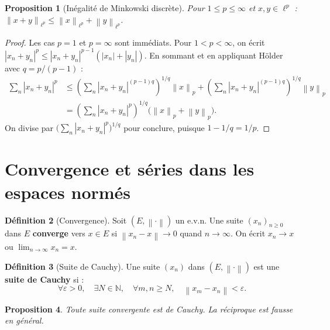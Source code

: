 \documentclass[a4paper,12pt]{book}
\newcommand{\N}{\mathbb{N}}
\newcommand{\norm}[1]{\left\| #1 \right\|}
\newcommand{\abs}[1]{\left| #1 \right|}
\theoremstyle{definition}
\newtheorem{definition}{Définition}[chapter]
\theoremstyle{plain}
\newtheorem{proposition}[definition]{Proposition}
\theoremstyle{remark}
\begin{document}
\begin{proposition}[Inégalité de Minkowski discrète]\label{prop:minkowski-discret}
Pour $1 \leq p \leq \infty$ et $x, y \in \ell^p$ : $\norm{x + y}_{\ell^p} \leq \norm{x}_{\ell^p} + \norm{y}_{\ell^p}$.
\end{proposition}

\begin{proof}
Les cas $p = 1$ et $p = \infty$ sont immédiats. Pour $1 < p < \infty$, on écrit $\abs{x_n + y_n}^p \leq \abs{x_n + y_n}^{p-1}(\abs{x_n} + \abs{y_n})$. En sommant et en appliquant Hölder avec $q = p/(p-1)$ :
\begin{align*}
    \sum_n \abs{x_n + y_n}^p &\leq \left(\sum_n \abs{x_n + y_n}^{(p-1)q}\right)^{1/q} \norm{x}_p + \left(\sum_n \abs{x_n + y_n}^{(p-1)q}\right)^{1/q} \norm{y}_p \\
    &= \left(\sum_n \abs{x_n + y_n}^p\right)^{1/q} \bigl(\norm{x}_p + \norm{y}_p\bigr).
\end{align*}
On divise par $\bigl(\sum_n \abs{x_n + y_n}^p\bigr)^{1/q}$ pour conclure, puisque $1 - 1/q = 1/p$.
\end{proof}

\section{Convergence et séries dans les espaces normés}

\begin{definition}[Convergence]\label{def:convergence-evn}
Soit $(E, \norm{\cdot})$ un e.v.n. Une suite $(x_n)_{n \geq 0}$ dans $E$ \textbf{converge} vers $x \in E$ si $\norm{x_n - x} \to 0$ quand $n \to \infty$. On écrit $x_n \to x$ ou $\lim_{n\to\infty} x_n = x$.
\end{definition}

\begin{definition}[Suite de Cauchy]\label{def:cauchy}
Une suite $(x_n)$ dans $(E, \norm{\cdot})$ est une \textbf{suite de Cauchy} si :
\[
    \forall \varepsilon > 0, \quad \exists N \in \N, \quad \forall m, n \geq N, \quad \norm{x_m - x_n} < \varepsilon.
\]
\end{definition}

\begin{proposition}\label{prop:cv-implique-cauchy}
Toute suite convergente est de Cauchy. La réciproque est fausse en général.
\end{proposition}
\end{document}
